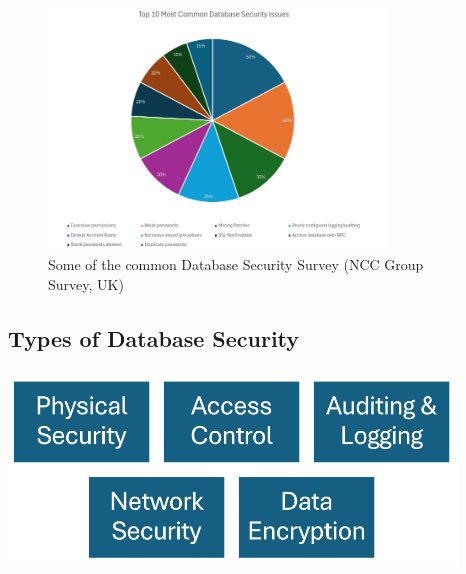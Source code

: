 \documentclass[12pt]{book} %
\begin{document}
\begin{figure}[h]
	\begin{center}
	\includegraphics[width=0.8\textwidth]{assets/top_10_most_common_db_security_issues.png}
	\end{center}
	\caption[]{Some of the common Database Security
    Survey (NCC Group Survey, UK)}
	\label{fig:top_10_most_common_db_security_issues}
\end{figure}


\subsection*{Types of Database Security}

\includegraphics[width=450px]{assets/types_of_db_security.png}\\[1cm] %
\end{document}
